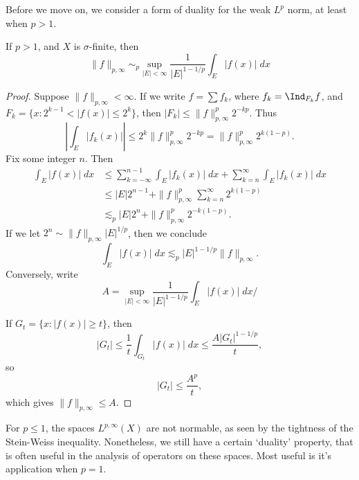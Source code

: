 Before we move on, we consider a form of duality for the weak $L^p$ norm, at least when $p > 1$.

\begin{theorem}
	If $p > 1$, and $X$ is $\sigma$-finite, then
	\[ \| f \|_{p,\infty} \sim_p \sup_{|E| < \infty} \frac{1}{|E|^{1-1/p}} \int_E |f(x)|\; dx \]
\end{theorem}
\begin{proof}
	Suppose $\| f \|_{p,\infty} < \infty$. If we write $f = \sum f_k$, where $f_k = \Ind_{F_k} f$, and $F_k = \{ x: 2^{k-1} < |f(x)| \leq 2^k \}$, then $|F_k| \leq \| f \|_{p,\infty}^p 2^{-kp}$. Thus
	\[ \left| \int_E |f_k(x)| \right| \leq 2^k \| f \|_{p,\infty}^p 2^{-kp} = \| f \|_{p,\infty}^p 2^{k(1-p)}. \]
	Fix some integer $n$. Then
	\begin{align*}
		\int_E |f(x)|\; dx &\leq \sum_{k = -\infty}^{n-1} \int_E |f_k(x)|\; dx + \sum_{k = n}^\infty \int_E |f_k(x)|\; dx\\
		&\leq |E| 2^{n-1} + \| f \|_{p,\infty}^p \sum_{k = n}^\infty 2^{k(1-p)}\\
		&\lesssim_p |E| 2^n + \| f \|_{p,\infty}^p 2^{-k(1-p)}.
	\end{align*}
	If we let $2^n \sim \| f \|_{p,\infty} |E|^{1/p}$, then we conclude
	\[ \int_E |f(x)|\; dx \lesssim_p |E|^{1 - 1/p} \| f \|_{p,\infty}. \]
	Conversely, write
	\[ A = \sup_{|E| < \infty} \frac{1}{|E|^{1-1/p}} \int_E |f(x)|\; dx/ \]

	If $G_t = \{ x: |f(x)| \geq t \}$, then
	\[ |G_t| \leq \frac{1}{t} \int_{G_t} |f(x)|\; dx \leq \frac{A |G_t|^{1 - 1/p}}{t}, \]
	so
	\[ |G_t| \leq \frac{A^p}{t}, \]
	which gives $\| f \|_{p,\infty} \leq A$.
\end{proof}

For $p \leq 1$, the spaces $L^{p,\infty}(X)$ are not normable, as seen by the tightness of the Stein-Weiss inequality. Nonetheless, we still have a certain `duality' property, that is often useful in the analysis of operators on these spaces. Most useful is it's application when $p = 1$.

